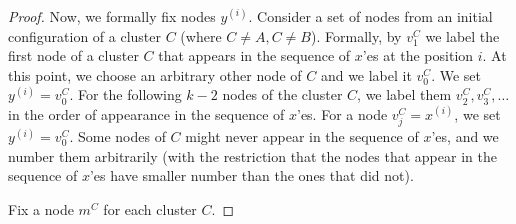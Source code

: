 \begin{proof}
  Now, we formally fix nodes $y^{(i)}$.
  Consider a set of nodes from an initial configuration of a cluster $C$ (where $C \neq A, C \neq B$).
  Formally, by $v^C_1$ we label the first node of a cluster $C$ that appears in the sequence of $x$'es at the position $i$.
  At this point, we choose an arbitrary other node of $C$ and we label it $v^C_0$.
  We set $y^{(i)} = v^C_0$.
  For the following $k-2$ nodes of the cluster $C$, we label them $v^C_2, v^C_3, \ldots$ in the order of appearance in the sequence of $x$'es.
  For a node $v^C_j = x^{(i)}$, we set $y^{(i)} = v^C_0$.
  Some nodes of $C$ might never appear in the sequence of $x$'es, and we number them arbitrarily (with the restriction that the nodes that appear in the sequence of $x$'es have smaller number than the ones that did not).
  


  

  

 
  
  Fix a node $m^C$ for each cluster $C$.
  
  
  

  
  
\end{proof}

